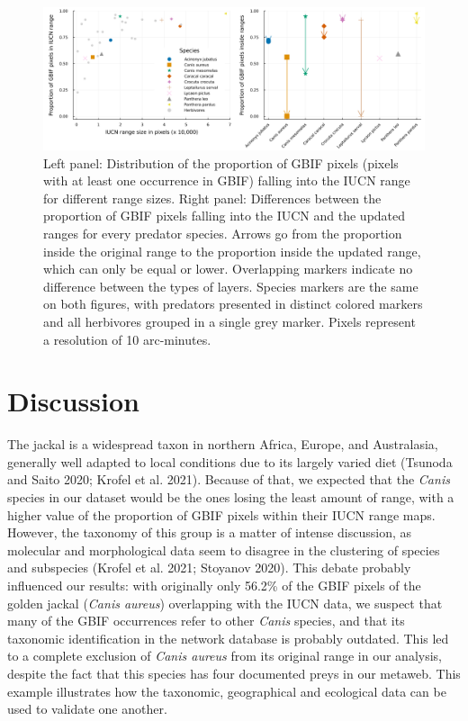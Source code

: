 \documentclass[10pt,oneside]{article}
\makeatletter
\def\maxwidth{\ifdim\Gin@nat@width>\linewidth\linewidth
\else\Gin@nat@width\fi}
\let\Oldincludegraphics\includegraphics
\renewcommand{\includegraphics}[1]{\Oldincludegraphics[width=\maxwidth]{#1}}
\makeatother
\begin{document}
\begin{figure}
\hypertarget{fig:gbif}{%
\centering
\includegraphics{figures/gbif_panels.png}
\caption{Left panel: Distribution of the proportion of GBIF pixels
(pixels with at least one occurrence in GBIF) falling into the IUCN
range for different range sizes. Right panel: Differences between the
proportion of GBIF pixels falling into the IUCN and the updated ranges
for every predator species. Arrows go from the proportion inside the
original range to the proportion inside the updated range, which can
only be equal or lower. Overlapping markers indicate no difference
between the types of layers. Species markers are the same on both
figures, with predators presented in distinct colored markers and all
herbivores grouped in a single grey marker. Pixels represent a
resolution of 10 arc-minutes.}\label{fig:gbif}
}
\end{figure}

\hypertarget{discussion}{%
\section{Discussion}\label{discussion}}

The jackal is a widespread taxon in northern Africa, Europe, and
Australasia, generally well adapted to local conditions due to its
largely varied diet (Tsunoda and Saito 2020; Krofel et al. 2021).
Because of that, we expected that the \emph{Canis} species in our
dataset would be the ones losing the least amount of range, with a
higher value of the proportion of GBIF pixels within their IUCN range
maps. However, the taxonomy of this group is a matter of intense
discussion, as molecular and morphological data seem to disagree in the
clustering of species and subspecies (Krofel et al. 2021; Stoyanov
2020). This debate probably influenced our results: with originally only
56.2\% of the GBIF pixels of the golden jackal (\emph{Canis aureus})
overlapping with the IUCN data, we suspect that many of the GBIF
occurrences refer to other \emph{Canis} species, and that its taxonomic
identification in the network database is probably outdated. This led to
a complete exclusion of \emph{Canis aureus} from its original range in
our analysis, despite the fact that this species has four documented
preys in our metaweb. This example illustrates how the taxonomic,
geographical and ecological data can be used to validate one another.
\end{document}
